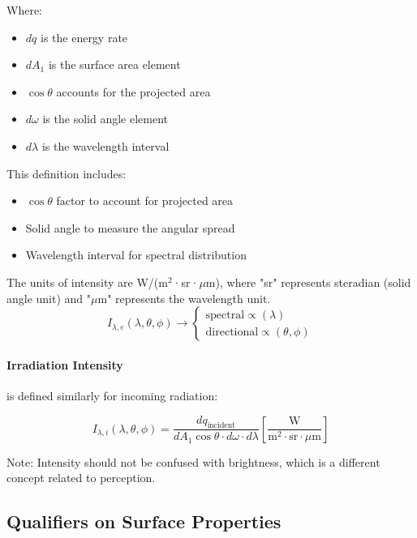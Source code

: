 Where:
\begin{itemize}
    \item $dq$ is the energy rate
    \item $dA_1$ is the surface area element
    \item $\cos\theta$ accounts for the projected area
    \item $d\omega$ is the solid angle element
    \item $d\lambda$ is the wavelength interval
\end{itemize}

This definition includes:
\begin{itemize}
    \item $\cos\theta$ factor to account for projected area
    \item Solid angle to measure the angular spread
    \item Wavelength interval for spectral distribution
\end{itemize}

The units of intensity are W/(m$^2$·sr·$\mu$m), where "sr" represents steradian (solid angle unit) and "$\mu$m" represents the wavelength unit.
%
\[
        I_{\lambda ,e}(\lambda, \theta, \phi) \rightarrow
        \left\{
            \begin{array}{l}
                \text{spectral} \propto (\lambda) 
                \\
                 \text{directional} \propto (\theta, \phi)
            \end{array}
        \right.
\]
%
\paragraph{Irradiation Intensity} is defined similarly for incoming radiation:

\[
I_{\lambda,i}(\lambda,\theta,\phi) = \frac{dq_{\text{incident}}}{dA_1 \cos\theta \cdot d\omega\cdot d\lambda} \left[\frac{\text{W}}{\text{m}^2 \cdot \text{sr} \cdot \mu\text{m}}\right]
\]

Note: Intensity should not be confused with brightness, which is a different concept related to perception.

\subsection*{Qualifiers on Surface Properties}

